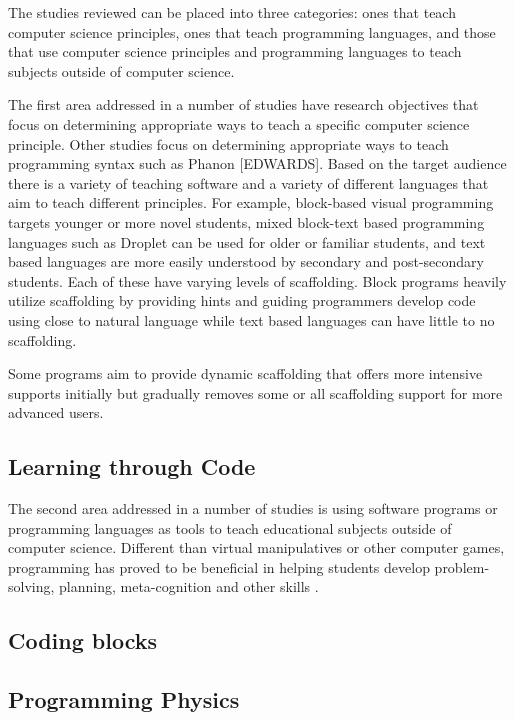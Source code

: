 \documentclass[12pt]{article}
\begin{document}
The studies reviewed can be placed into three categories: ones that teach computer science principles, ones that teach programming languages, and those that use computer science principles and programming languages to teach subjects outside of computer science.

The first area addressed in a number of studies have research objectives that focus on determining appropriate ways to teach a specific computer science principle.
Other studies focus on determining appropriate ways to teach programming syntax such as Phanon [EDWARDS].
Based on the target audience there is a variety of teaching software and a variety of different languages that aim to teach different principles.
For example, block-based visual programming targets younger or more novel students, mixed block-text based programming languages such as Droplet can be used for older or familiar students, and text based languages are more easily understood by secondary and post-secondary students.
Each of these have varying levels of scaffolding.
Block programs heavily utilize scaffolding by providing hints and guiding programmers develop code using close to natural language while text based languages can have little to no scaffolding.

Some programs aim to provide dynamic scaffolding that offers more intensive supports initially but gradually removes some or all scaffolding support for more advanced users.
    
\subsection*{Learning through Code}
The second area addressed in a number of studies is using software programs or programming languages as tools to teach educational subjects outside of computer science.
Different than virtual manipulatives or other computer games, programming has proved to be beneficial in helping students develop problem-solving, planning, meta-cognition and other skills \cite{papadakis, fuchs}.

\subsection{Coding blocks}\cite{}
\subsection{Programming Physics}\cite{sherin}
\end{document}

